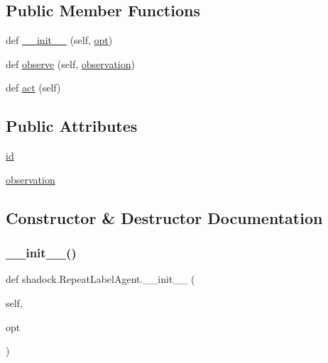 \subsection*{Public Member Functions}
\begin{DoxyCompactItemize}
\item 
def \hyperlink{classshadock_1_1RepeatLabelAgent_aa39519dbddd86ff20666995ea8202ea2}{\+\_\+\+\_\+init\+\_\+\+\_\+} (self, \hyperlink{classparlai_1_1core_1_1agents_1_1Agent_ab3b45d2754244608c75d4068b90cd051}{opt})
\item 
def \hyperlink{classshadock_1_1RepeatLabelAgent_a72e70867bd2e94077d26b52a6040914e}{observe} (self, \hyperlink{classshadock_1_1RepeatLabelAgent_a2455b332a14c998490f888f28322a3bd}{observation})
\item 
def \hyperlink{classshadock_1_1RepeatLabelAgent_aec9b605ede2ba59d9a46aa913bd15649}{act} (self)
\end{DoxyCompactItemize}
\subsection*{Public Attributes}
\begin{DoxyCompactItemize}
\item 
\hyperlink{classshadock_1_1RepeatLabelAgent_af4a393b8da6a36d52f38ea8162efae09}{id}
\item 
\hyperlink{classshadock_1_1RepeatLabelAgent_a2455b332a14c998490f888f28322a3bd}{observation}
\end{DoxyCompactItemize}


\subsection{Constructor \& Destructor Documentation}
\mbox{\label{classshadock_1_1RepeatLabelAgent_aa39519dbddd86ff20666995ea8202ea2}} 
\subsubsection{\texorpdfstring{\+\_\+\+\_\+init\+\_\+\+\_\+()}{\_\_init\_\_()}}
{\footnotesize\ttfamily def shadock.\+Repeat\+Label\+Agent.\+\_\+\+\_\+init\+\_\+\+\_\+ (\begin{DoxyParamCaption}\item[{}]{self,  }\item[{}]{opt }\end{DoxyParamCaption})}



